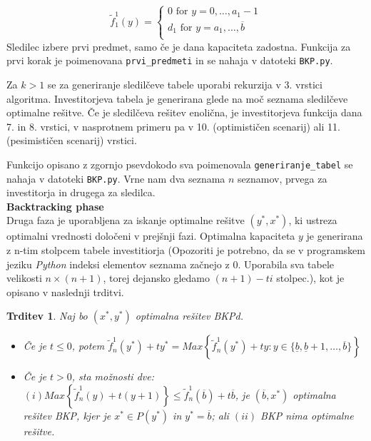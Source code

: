 \documentclass[a4paper, 11pt]{article}
\newtheorem{theorem}{Trditev}
\begin{document}
	\[   
	\text{$\widetilde{f}^{1}_{1}(y) =$}
    	\begin{cases}
	 	\text{0 for $y = 0, \dots, a_1 - 1$} \\
       		\text{$d_1$ for $y = a_1, \dots, \overline{b}$} \\
    	\end{cases}
	\]
	Sledilec izbere prvi predmet, samo če je dana kapaciteta zadostna. Funkcija za prvi korak je poimenovana \texttt{prvi\_predmeti} in se nahaja v datoteki \texttt{BKP.py}.
	
	Za $k > 1$ se za generiranje sledilčeve tabele uporabi rekurzija v 3. vrstici algoritma. Investitorjeva tabela je generirana glede na moč seznama sledilčeve optimalne rešitve. Če je sledilčeva rešitev enolična, je investitorjeva funkcija dana 7. in 8. vrstici, v nasprotnem primeru pa v 10. (optimističen scenarij) ali 11. (pesimističen scenarij) vrstici. 
	
	Funkcijo opisano z zgornjo psevdokodo sva poimenovala \texttt{generiranje\_tabel} se nahaja v datoteki \texttt{BKP.py}. Vrne nam dva seznama $n$ seznamov, prvega za investitorja in drugega za sledilca. \\
	
	\textbf{Backtracking phase} \\
	Druga faza je uporabljena za iskanje optimalne rešitve $(y^*, x^*)$, ki ustreza optimalni vrednosti določeni v prejšnji fazi. Optimalna kapaciteta $y$ je generirana z n-tim stolpcem tabele investitiorja (Opozoriti je potrebno, da se v programskem jeziku \textit{Python} indeksi elementov seznama začnejo z 0. Uporabila sva tabele velikosti $n \times (n+1)$, torej dejansko gledamo $(n+1)-ti$ stolpec.), kot je opisano v naslednji trditvi.
	
	\begin{theorem}
	Naj bo $(x^*, y^*)$ optimalna rešitev BKPd.
	\begin{itemize}
		\item Če je $t \leq 0$, potem $\widetilde{f}^{1}_{n}(y^*) + ty^* = Max \left\{ \widetilde{f}^{1}_{n}(y^*) + ty : y \in \{\underline{b}, \underline{b} + 1, \dots, \overline{b} \} \right\}$
		\item Če je $t > 0$, sta možnosti dve: $(i) Max \left\{ \widetilde{f}^{1}_{n}(y) + t(y + 1) \right\} \leq \widetilde{f}^{1}_{n}(\overline{b}) + t\overline{b}$, je $( \overline{b}, x^* )$ optimalna rešitev BKP, kjer je $x^* \in P(y^*)$ in $y^* = \overline{b}$; ali $(ii)$ BKP nima optimalne rešitve.
	\end{itemize}
	\end{theorem}
	
\end{document}
